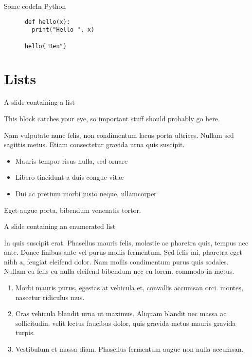 \documentclass[
  ignorenonframetext,
  aspectratio=169,
  xcolor={dvipsnames,rgb}
]{beamer}
\begin{document}
  \begin{frame}[fragile=singleslide]{Some code}{In Python}

    \begin{lstlisting}
      def hello(x):
        print("Hello ", x)

      hello("Ben")
    \end{lstlisting}

  \end{frame}

\hypertarget{lists}{\section{Lists}}

  \begin{frame}{A slide containing a list}

    This block catches your eye, so \alert{important stuff} should probably go here.

    Nam vulputate nunc felis, non condimentum lacus porta ultrices. Nullam sed sagittis metus. Etiam consectetur gravida urna quis suscipit.

    \begin{itemize}
      \item \alert{Mauris tempor} risus nulla, sed ornare
      \item \alert{Libero tincidunt} a duis congue vitae
      \item \alert{Dui ac pretium} morbi justo neque, ullamcorper
    \end{itemize}

    Eget augue porta, bibendum venenatis tortor.

  \end{frame}

  \begin{frame}{A slide containing an enumerated list}

    In quis suscipit erat. \alert{Phasellus mauris felis, molestie ac pharetra quis}, tempus nec ante. Donec finibus ante vel purus mollis fermentum. Sed felis mi, pharetra eget nibh a, feugiat eleifend dolor. Nam mollis condimentum purus quis sodales. Nullam eu felis eu nulla eleifend bibendum nec eu lorem. commodo in metus.

    \begin{enumerate}
      \item \alert{Morbi mauris purus}, egestas at vehicula et, convallis accumsan orci. montes, nascetur ridiculus mus.
      \item \alert{Cras vehicula blandit urna ut maximus}. Aliquam blandit nec massa ac sollicitudin. velit lectus faucibus dolor, quis gravida metus mauris gravida turpis.
      \item \alert{Vestibulum et massa diam}. Phasellus fermentum augue non nulla accumsan.
    \end{enumerate}

  \end{frame}
\end{document}
